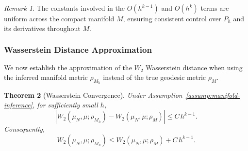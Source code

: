 \documentclass{article}
\theoremstyle{plain}
\newtheorem{theorem}{Theorem}[section]
\theoremstyle{definition}
\theoremstyle{remark}
\newtheorem{remark}[theorem]{Remark}
\begin{document}
\begin{remark}
The constants involved in the $O(h^{k-1})$ and $O(h^k)$ terms are uniform across the compact manifold $M$, ensuring consistent control over $P_h$ and its derivatives throughout $M$.
\end{remark}

\subsubsection{Wasserstein Distance Approximation}

We now establish the approximation of the $W_2$ Wasserstein distance when using the inferred manifold metric $\rho_{M_h}$ instead of the true geodesic metric $\rho_M$.

\begin{theorem}[Wasserstein Convergence]
\label{thm:w2-main-app}
Under Assumption~\ref{assump:manifold-inference}, for sufficiently small $h$,
$$
\left| W_2(\mu_N, \mu; \rho_{M_h}) - W_2(\mu_N, \mu; \rho_M) \right| \leq C\,h^{k-1}.
$$
Consequently,
$$
W_2(\mu_N, \mu; \rho_{M_h}) \leq W_2(\mu_N, \mu; \rho_M) + C\,h^{k-1}.
$$
\end{theorem}
\end{document}
